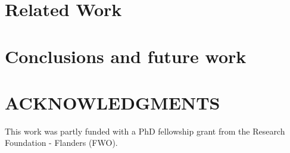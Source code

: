 \documentclass{sagej}
\begin{document}
\section{Related Work}
\label{sec:5-related-work}


\section{Conclusions and future work}
\label{sec:6-conclusion}


\section*{ACKNOWLEDGMENTS}
This work was partly funded with a PhD fellowship grant from the Research Foundation - Flanders (FWO). 



\end{document}
